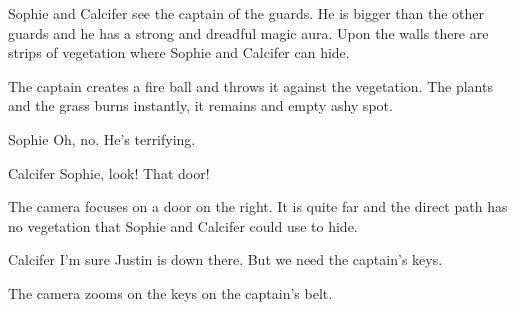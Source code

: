 \begin{screenplay}

Sophie and Calcifer see the captain of the guards. He is bigger than the other guards and he has a strong and dreadful magic aura. Upon the walls there are strips of vegetation where Sophie and Calcifer can hide.

The captain creates a fire ball and throws it against the vegetation. The plants and the grass burns instantly, it remains and empty ashy spot.

\begin{dialogue}{Sophie}
Oh, no. He's terrifying.
\end{dialogue}

\begin{dialogue}{Calcifer}
Sophie, look! That door!
\end{dialogue}

The camera focuses on a door on the right. It is quite far and the direct path has no vegetation that Sophie and Calcifer could use to hide.

\begin{dialogue}[continuing]{Calcifer}
I'm sure Justin is down there. But we need the captain's keys.
\end{dialogue}

The camera zooms on the keys on the captain's belt.

\end{screenplay}
\vspace{1em}

